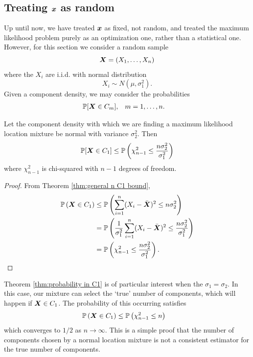 	\subsection{Treating \texorpdfstring{${\bm{{x}}}$}{x} as random}

		Up until now, we have treated ${\bm{{x}}}$ as fixed, not random, and treated the maximum likelihood problem purely as an optimization one, rather than a statistical one. However, for this section we consider a random sample
		\begin{equation}
			{\bm{{X}}} = (X_1, \dots, X_n)
		\end{equation}
		where the $X_i$ are i.i.d. with normal distribution 
		\begin{equation}
			X_i \sim N(\mu, \sigma_1^2).
		\end{equation}
		Given a component density, we may consider the probabilities
		\begin{align}
			&\mathbb{P}[{\bm{{X}}} \in C_m],	&&m = 1,\dots,n.
		\end{align}
		
		\begin{theorem}
		\label{thm:probability in C1}
			Let the component density with which we are finding a maximum likelihood location mixture be normal with variance $\sigma_2^2$. Then 
			\begin{equation}
				\mathbb{P}[{\bm{{X}}} \in C_1] \leq \mathbb{P}\left(\chi_{n-1}^2 \leq \frac{n \sigma_2^2}{\sigma_1^2}\right)
			\end{equation}
			where $\chi_{n-1}^2$ is chi-squared with $n-1$ degrees of freedom.
		\end{theorem}
		\begin{proof}
			From Theorem \ref{thm:general n C1 bound},
			\begin{align}
			\mathbb{P}\left({\bm{{X}}} \in C_1 \right) &\leq \mathbb{P} \left( \sum_{i=1}^n (X_i - \bar{{\bm{{X}}}})^2 \leq n \sigma_2^2  \right) \\
				&= \mathbb{P}\left( \frac{1}{\sigma_1^2}\sum_{i=1}^n (X_i - \bar{{\bm{{X}}}})^2 \leq \frac{n \sigma_2^2}{\sigma_1^2}\right)\\
				&= \mathbb{P}\left(\chi_{n-1}^2  \leq \frac{n \sigma_2^2}{\sigma_1^2} \right).
			\end{align}
		\end{proof}

		Theorem \ref{thm:probability in C1} is of particular interest when the $\sigma_1 = \sigma_2$. In this case, our mixture can select the `true' number of components, which will happen if ${\bm{{X}}} \in C_1$. The probability of this occurring satisfies
		\begin{align}
			\mathbb{P}\left({\bm{{X}}} \in C_1\right) &\leq \mathbb{P}\left(\chi_{n-1}^2 \leq n\right)
		\end{align}
		which converges to $1/2$ as $n \rightarrow \infty$. This is a simple proof that the number of components chosen by a normal location mixture is not a consistent estimator for the true number of components.

